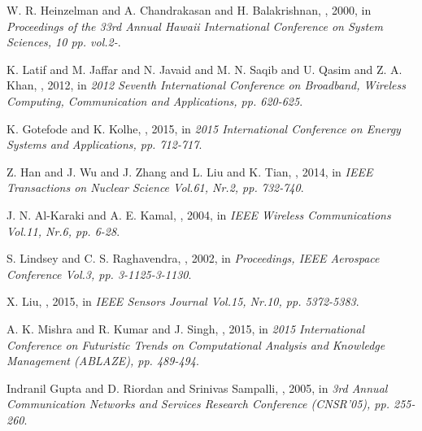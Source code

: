 \documentclass[USenglish]{uit-thesis}
\begin{document}
\begin{thebibliography}{9}
W. R. Heinzelman and A. Chandrakasan and H. Balakrishnan,
, 2000,
\newblock in {\em Proceedings of the 33rd Annual Hawaii International Conference on System Sciences, 10 pp. vol.2-}.

K. Latif and M. Jaffar and N. Javaid and M. N. Saqib and U. Qasim and Z. A. Khan,
, 2012,
\newblock in {\em 2012 Seventh International Conference on Broadband, Wireless Computing, Communication and Applications, pp. 620-625}.

K. Gotefode and K. Kolhe,
, 2015,
\newblock in {\em 2015 International Conference on Energy Systems and Applications, pp. 712-717}.

Z. Han and J. Wu and J. Zhang and L. Liu and K. Tian,
, 2014,
\newblock in {\em IEEE Transactions on Nuclear Science Vol.61, Nr.2, pp. 732-740}.

J. N. Al-Karaki and A. E. Kamal,
, 2004,
\newblock in {\em IEEE Wireless Communications Vol.11, Nr.6, pp. 6-28}.

S. Lindsey and C. S. Raghavendra,
, 2002,
\newblock in {\em Proceedings, IEEE Aerospace Conference Vol.3, pp. 3-1125-3-1130}.

X. Liu,
, 2015,
\newblock in {\em IEEE Sensors Journal Vol.15, Nr.10, pp. 5372-5383}.

A. K. Mishra and R. Kumar and J. Singh,
, 2015,
\newblock in {\em 2015 International Conference on Futuristic Trends on Computational Analysis and Knowledge Management (ABLAZE), pp. 489-494}.

Indranil Gupta and D. Riordan and Srinivas Sampalli,
, 2005,
\newblock in {\em 3rd Annual Communication Networks and Services Research Conference (CNSR'05), pp. 255-260}.


\end{thebibliography}
\end{document}
